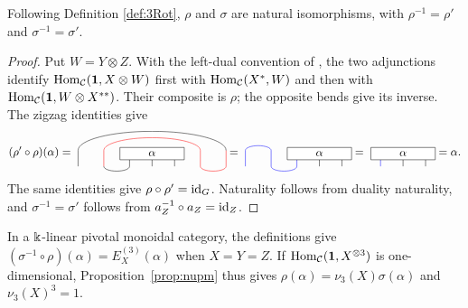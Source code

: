 \documentclass{amsart}
\begin{document}
\begin{lemma} \label{lem:3RotBij}
Following Definition \ref{def:3Rot}, $\rho$ and $\sigma$ are natural isomorphisms, with $\rho^{-1} = \rho'$ and $\sigma^{-1} = \sigma'$.
\end{lemma}
\begin{proof}
Put $W=Y\otimes Z$. With the left-dual convention of \cite[Proposition~2.10.8(a), p.~42]{EGNO15}, the two adjunctions identify $\mathrm{Hom}_{\mathcal{C}}({\bf 1},X\otimes W)$ first with $\mathrm{Hom}_{\mathcal{C}}(X^*,W)$ and then with $\mathrm{Hom}_{\mathcal{C}}({\bf 1},W\otimes X^{**})$. Their composite is $\rho$; the opposite bends give its inverse. The zigzag identities give
$$(\rho' \circ \rho)(\alpha) =
\raisebox{-.5cm}{
\begin{tikzpicture}
\draw (-.7+0.6,0)--++(0,-.4) arc (0:-180:.4 and .15);
\draw[color=red] (-.9,-.4) --++(0,.5) arc (180:0:1.5 and .4) --++(0,-.5) arc (-180:0:.4 and .15) --++(0,.5);
\draw (3-.1,.1) arc (0:180:2.3 and .6) --++(0,-.5);
\draw (0+0.6,0)--++(0,-.4);
\draw (.7+0.6,0)--++(0,-.4);
\draw (0.6,0) node [draw,fill=white,minimum width=2cm] {$\alpha$};
\end{tikzpicture}}
=
\raisebox{-.5cm}{
\begin{tikzpicture}
\draw[color=blue] (-.7+0.6,0)--++(0,-.4) arc (0:-180:.4 and .15) --++(0,.5) arc (0:180:.4 and .15) --++(0,-.5);
\draw (0+0.6,0)--++(0,-.4);
\draw (.7+0.6,0)--++(0,-.4);
\draw (0.6,0) node [draw,fill=white,minimum width=2cm] {$\alpha$};
\end{tikzpicture}}
=
\raisebox{-.35cm}{
\begin{tikzpicture}
\draw[color=blue] (-.7+0.6,0)--++(0,-.4);
\draw (0+0.6,0)--++(0,-.4);
\draw (.7+0.6,0)--++(0,-.4);
\draw (0.6,0) node [draw,fill=white,minimum width=2cm] {$\alpha$};
\end{tikzpicture}}
= \alpha.
$$
The same identities give $\rho\circ\rho^{\prime}=\mathrm{id}_G$. Naturality follows from duality naturality, and $\sigma^{-1}=\sigma'$ follows from $a_Z^{-1}\circ a_Z=\mathrm{id}_Z$.
\end{proof}

\begin{remark} \label{rk:FS3}
In a $\Bbbk$-linear pivotal monoidal category, the definitions give
$(\sigma^{-1}\circ\rho)(\alpha)=E_X^{(3)}(\alpha)$ when $X=Y=Z$.
If $\mathrm{Hom}_{\mathcal{C}}({\bf 1},X^{\otimes3})$ is one-dimensional, Proposition~\ref{prop:nupm}
thus gives $\rho(\alpha)=\nu_3(X)\sigma(\alpha)$ and $\nu_3(X)^3=1$.
\end{remark}
\end{document}

